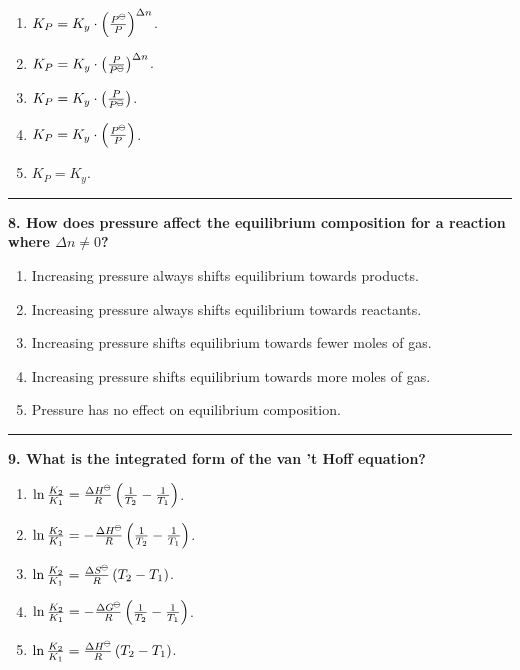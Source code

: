 \documentclass[
  9pt,
]{extbook}
\providecommand{\tightlist}{%
  \setlength{\itemsep}{0pt}\setlength{\parskip}{0pt}}
\theoremstyle{definition}
\theoremstyle{definition}
\theoremstyle{definition}
\theoremstyle{remark}
\begin{document}
\begin{enumerate}
\def\labelenumi{\alph{enumi}.}
\tightlist
\item
  \(K_P = K_y \cdot \left(\frac{P^{{-\kern-6pt{\ominus}\kern-6pt-}}}{P}\right)^{\Delta n}\).
\item
  \(K_P = K_y \cdot \left(\frac{P}{P^{{-\kern-6pt{\ominus}\kern-6pt-}}}\right)^{\Delta n}\).
\item
  \(K_P = K_y \cdot \left(\frac{P}{P^{{-\kern-6pt{\ominus}\kern-6pt-}}}\right)\).
\item
  \(K_P = K_y \cdot \left(\frac{P^{{-\kern-6pt{\ominus}\kern-6pt-}}}{P}\right)\).
\item
  \(K_P = K_y\).
\end{enumerate}

\begin{center}\rule{0.5\linewidth}{0.5pt}\end{center}

\textbf{8. How does pressure affect the equilibrium composition for a reaction where \(\Delta n \neq 0\)?}

\begin{enumerate}
\def\labelenumi{\alph{enumi}.}
\tightlist
\item
  Increasing pressure always shifts equilibrium towards products.
\item
  Increasing pressure always shifts equilibrium towards reactants.
\item
  Increasing pressure shifts equilibrium towards fewer moles of gas.
\item
  Increasing pressure shifts equilibrium towards more moles of gas.
\item
  Pressure has no effect on equilibrium composition.
\end{enumerate}

\begin{center}\rule{0.5\linewidth}{0.5pt}\end{center}

\textbf{9. What is the integrated form of the van 't Hoff equation?}

\begin{enumerate}
\def\labelenumi{\alph{enumi}.}
\tightlist
\item
  \(\ln\frac{K_2}{K_1} = \frac{\Delta H^{{-\kern-6pt{\ominus}\kern-6pt-}}}{R}\left(\frac{1}{T_2} - \frac{1}{T_1}\right)\).
\item
  \(\ln\frac{K_2}{K_1} = -\frac{\Delta H^{{-\kern-6pt{\ominus}\kern-6pt-}}}{R}\left(\frac{1}{T_2} - \frac{1}{T_1}\right)\).
\item
  \(\ln\frac{K_2}{K_1} = \frac{\Delta S^{{-\kern-6pt{\ominus}\kern-6pt-}}}{R}\left(T_2 - T_1\right)\).
\item
  \(\ln\frac{K_2}{K_1} = -\frac{\Delta G^{{-\kern-6pt{\ominus}\kern-6pt-}}}{R}\left(\frac{1}{T_2} - \frac{1}{T_1}\right)\).
\item
  \(\ln\frac{K_2}{K_1} = \frac{\Delta H^{{-\kern-6pt{\ominus}\kern-6pt-}}}{R}\left(T_2 - T_1\right)\).
\end{enumerate}
\end{document}
